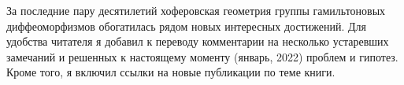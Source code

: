 За последние пару десятилетий хоферовская геометрия группы гамильтоновых диффеоморфизмов обогатилась рядом новых интересных достижений.
Для удобства читателя я добавил к переводу комментарии на несколько устаревших замечаний и решенных к настоящему моменту (январь, 2022) проблем и гипотез.
Кроме того, я включил ссылки на новые публикации по теме книги.

